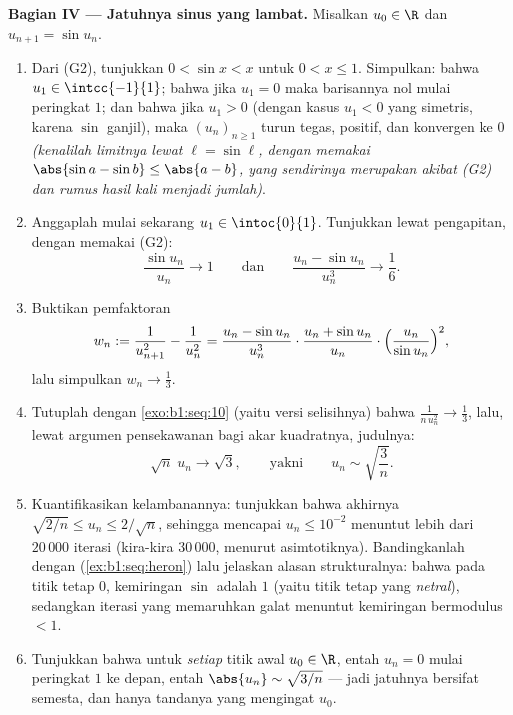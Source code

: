 \begin{problem}[{Soal akhir pekan --- teorema Cesàro--Stolz
dan asimtotik $u_n \sim \sqrt{3/n}$ untuk $u_{n+1} = \sin
u_n$}]
\medskip
\noindent\textbf{Bagian IV --- Jatuhnya sinus yang lambat.} Misalkan
$u_0 \in \R$ dan $u_{n+1} = \sin u_n$.
\begin{enumerate}[resume]
  \item Dari (G2), tunjukkan $0 < \sin x < x$ untuk $0 < x \leq 1$.
        Simpulkan: bahwa $u_1 \in \intcc{-1}{1}$; bahwa jika $u_1 = 0$ maka
        barisannya nol mulai peringkat $1$; dan bahwa jika $u_1 > 0$ (dengan
        kasus $u_1 < 0$ yang simetris, karena $\sin$ ganjil), maka
        $(u_n)_{n \geq 1}$ turun tegas, positif, dan
        konvergen ke $0$ \emph{(kenalilah limitnya lewat $\ell =
        \sin \ell$, dengan memakai $\abs{\sin a - \sin b} \leq \abs{a -
        b}$, yang sendirinya merupakan akibat (G2) dan rumus
        hasil kali menjadi jumlah)}.
  \item Anggaplah mulai sekarang $u_1 \in \intoc{0}{1}$. Tunjukkan lewat
        pengapitan, dengan memakai (G2):
        \[
        \frac{\sin u_n}{u_n} \to 1
        \qquad\text{dan}\qquad
        \frac{u_n - \sin u_n}{u_n^{3}} \to \frac16 .
        \]
  \item Buktikan pemfaktoran
        \[
        w_n := \frac{1}{u_{n+1}^{2}} - \frac{1}{u_n^{2}}
        = \frac{u_n - \sin u_n}{u_n^{3}} \cdot
        \frac{u_n + \sin u_n}{u_n} \cdot
        \Bigl(\frac{u_n}{\sin u_n}\Bigr)^{2},
        \]
        lalu simpulkan $w_n \to \frac13$.
  \item Tutuplah dengan \cref{exo:b1:seq:10} (yaitu versi selisihnya)
        bahwa $\frac{1}{n\,u_n^{2}} \to \frac13$, lalu, lewat
        argumen pensekawanan bagi akar kuadratnya, judulnya:
        \[
        \sqrt n\;u_n \longrightarrow \sqrt 3 ,
        \qquad\text{yakni}\qquad
        u_n \sim \sqrt{\frac 3n} .
        \]
  \item Kuantifikasikan kelambanannya: tunjukkan bahwa akhirnya $\sqrt{2/n}
        \leq u_n \leq 2/\sqrt n$, sehingga mencapai $u_n \leq
        10^{-2}$ menuntut lebih dari $20\,000$ iterasi (kira-kira
        $30\,000$, menurut asimtotiknya). Bandingkanlah dengan  (\cref{ex:b1:seq:heron}) lalu jelaskan
        alasan strukturalnya: bahwa pada titik tetap $0$, kemiringan
        $\sin$ adalah $1$ (yaitu titik tetap yang \emph{netral}), sedangkan
        iterasi yang memaruhkan galat menuntut kemiringan bermodulus $< 1$.
  \item Tunjukkan bahwa untuk \emph{setiap} titik awal $u_0 \in \R$,
        entah $u_n = 0$ mulai peringkat $1$ ke depan, entah $\abs{u_n} \sim
        \sqrt{3/n}$ --- jadi jatuhnya bersifat semesta, dan hanya tandanya
        yang mengingat $u_0$.
\end{enumerate}


\end{problem}
